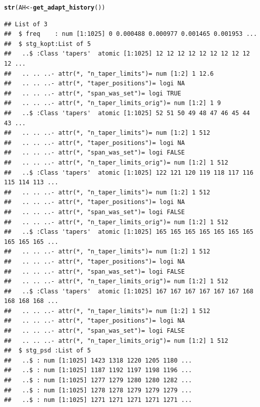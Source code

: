 \documentclass[10pt]{article}\usepackage[]{graphicx}\usepackage[]{color}
\makeatletter
\newcommand{\hlstd}[1]{\textcolor[rgb]{0.345,0.345,0.345}{#1}}%
\newcommand{\hlkwb}[1]{\textcolor[rgb]{0.69,0.353,0.396}{#1}}%
\newcommand{\hlkwd}[1]{\textcolor[rgb]{0.737,0.353,0.396}{\textbf{#1}}}%
\newenvironment{kframe}{%
 \def\at@end@of@kframe{}%
 \ifinner\ifhmode%
  \def\at@end@of@kframe{\end{minipage}}%
  \begin{minipage}{\columnwidth}%
 \fi\fi%
 \def\FrameCommand##1{\hskip\@totalleftmargin \hskip-\fboxsep
 \colorbox{shadecolor}{##1}\hskip-\fboxsep
     \hskip-\linewidth \hskip-\@totalleftmargin \hskip\columnwidth}%
 \MakeFramed {\advance\hsize-\width
   \@totalleftmargin\z@ \linewidth\hsize
   \@setminipage}}%
 {\par\unskip\endMakeFramed%
 \at@end@of@kframe}
\newenvironment{knitrout}{}{} %
\makeatother
\begin{document}
\begin{knitrout}
\begin{kframe}
{\ttfamily\noindent\itshape\color{messagecolor}{\#\# Stage\ \ 0 est. (pilot) \\\#\# 	environment\ \ ** .psdEnv **\ \ refreshed\\\#\# detrending (and demeaning)\\\#\# Stage\ \ 1 est. (Ave. S.V.R. -16.6 dB) \\\#\# Stage\ \ 2 est. (Ave. S.V.R. -35.1 dB) \\\#\# Stage\ \ 3 est. (Ave. S.V.R. -43.9 dB) \\\#\# Stage\ \ 4 est. (Ave. S.V.R. -45.0 dB) \\\#\# Normalized\ \ single-sided PSD\ \ (PSD)\ \ to single-sided PSD for sampling-freq.\ \ 1}}\begin{alltt}
\hlkwd{str}\hlstd{(AH} \hlkwb{<-} \hlkwd{get_adapt_history}\hlstd{())}
\end{alltt}
\begin{verbatim}
## List of 3
##  $ freq    : num [1:1025] 0 0.000488 0.000977 0.001465 0.001953 ...
##  $ stg_kopt:List of 5
##   ..$ :Class 'tapers'  atomic [1:1025] 12 12 12 12 12 12 12 12 12 12 ...
##   .. .. ..- attr(*, "n_taper_limits")= num [1:2] 1 12.6
##   .. .. ..- attr(*, "taper_positions")= logi NA
##   .. .. ..- attr(*, "span_was_set")= logi TRUE
##   .. .. ..- attr(*, "n_taper_limits_orig")= num [1:2] 1 9
##   ..$ :Class 'tapers'  atomic [1:1025] 52 51 50 49 48 47 46 45 44 43 ...
##   .. .. ..- attr(*, "n_taper_limits")= num [1:2] 1 512
##   .. .. ..- attr(*, "taper_positions")= logi NA
##   .. .. ..- attr(*, "span_was_set")= logi FALSE
##   .. .. ..- attr(*, "n_taper_limits_orig")= num [1:2] 1 512
##   ..$ :Class 'tapers'  atomic [1:1025] 122 121 120 119 118 117 116 115 114 113 ...
##   .. .. ..- attr(*, "n_taper_limits")= num [1:2] 1 512
##   .. .. ..- attr(*, "taper_positions")= logi NA
##   .. .. ..- attr(*, "span_was_set")= logi FALSE
##   .. .. ..- attr(*, "n_taper_limits_orig")= num [1:2] 1 512
##   ..$ :Class 'tapers'  atomic [1:1025] 165 165 165 165 165 165 165 165 165 165 ...
##   .. .. ..- attr(*, "n_taper_limits")= num [1:2] 1 512
##   .. .. ..- attr(*, "taper_positions")= logi NA
##   .. .. ..- attr(*, "span_was_set")= logi FALSE
##   .. .. ..- attr(*, "n_taper_limits_orig")= num [1:2] 1 512
##   ..$ :Class 'tapers'  atomic [1:1025] 167 167 167 167 167 167 168 168 168 168 ...
##   .. .. ..- attr(*, "n_taper_limits")= num [1:2] 1 512
##   .. .. ..- attr(*, "taper_positions")= logi NA
##   .. .. ..- attr(*, "span_was_set")= logi FALSE
##   .. .. ..- attr(*, "n_taper_limits_orig")= num [1:2] 1 512
##  $ stg_psd :List of 5
##   ..$ : num [1:1025] 1423 1318 1220 1205 1180 ...
##   ..$ : num [1:1025] 1187 1192 1197 1198 1196 ...
##   ..$ : num [1:1025] 1277 1279 1280 1280 1282 ...
##   ..$ : num [1:1025] 1278 1278 1279 1279 1279 ...
##   ..$ : num [1:1025] 1271 1271 1271 1271 1271 ...
\end{verbatim}
\end{kframe}
\end{knitrout}
\end{document}
